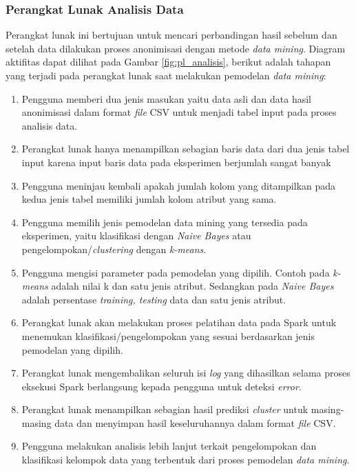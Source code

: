 \subsubsection{Perangkat Lunak Analisis Data}
Perangkat lunak ini bertujuan untuk mencari perbandingan hasil sebelum dan setelah data dilakukan proses anonimisasi dengan metode \textit{data mining}. Diagram aktifitas dapat dilihat pada Gambar \ref{fig:pl_analisis}, berikut adalah tahapan yang terjadi pada perangkat lunak saat melakukan pemodelan \textit{data mining}:

\begin{enumerate}

\item Pengguna memberi dua jenis masukan yaitu data asli dan data hasil anonimisasi dalam format \textit{file} CSV untuk menjadi tabel input pada proses analisis data.

\item Perangkat lunak hanya menampilkan sebagian baris data dari dua jenis tabel input karena input baris data pada eksperimen berjumlah sangat banyak 

\item Pengguna meninjau kembali apakah jumlah kolom yang ditampilkan pada kedua jenis tabel memiliki jumlah kolom atribut yang sama.

\item Pengguna memilih jenis pemodelan data mining yang tersedia pada eksperimen, yaitu klasifikasi dengan \textit{Naive Bayes} atau pengelompokan/\textit{clustering} dengan \textit{k-means}. 

\item Pengguna mengisi parameter pada pemodelan yang dipilih. Contoh pada \textit{k-means} adalah nilai k dan satu jenis atribut. Sedangkan pada \textit{Naive Bayes} adalah persentase \textit{training, testing} data dan satu jenis atribut.

\item Perangkat lunak akan melakukan proses pelatihan data pada Spark untuk menemukan klasifikasi/pengelompokan yang sesuai berdasarkan jenis pemodelan yang dipilih.

\item Perangkat lunak mengembalikan seluruh isi \textit{log} yang dihasilkan selama proses eksekusi Spark berlangsung kepada pengguna untuk deteksi \textit{error}.

\item Perangkat lunak menampilkan sebagian hasil prediksi \textit{cluster} untuk masing-masing data dan menyimpan hasil keseluruhannya dalam format \textit{file} CSV.

\item Pengguna melakukan analisis lebih lanjut terkait pengelompokan dan klasifikasi kelompok data yang terbentuk dari proses pemodelan \textit{data mining}.
\end{enumerate}

